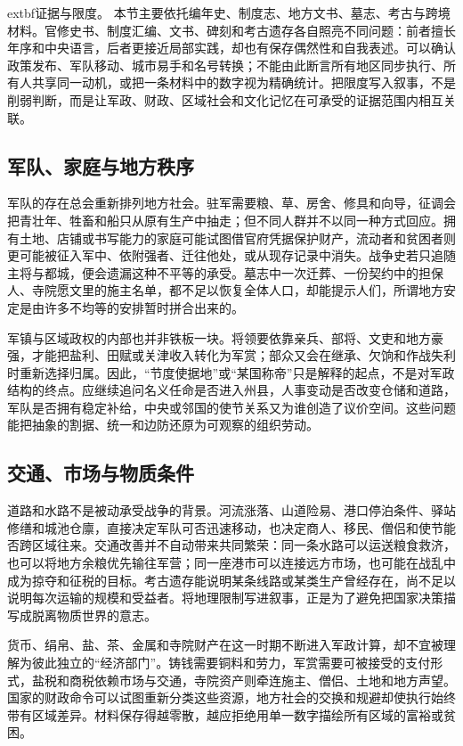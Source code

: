 \noindent	extbf{证据与限度。} 本节主要依托编年史、制度志、地方文书、墓志、考古与跨境材料。官修史书、制度汇编、文书、碑刻和考古遗存各自照亮不同问题：前者擅长年序和中央语言，后者更接近局部实践，却也有保存偶然性和自我表述。可以确认政策发布、军队移动、城市易手和名号转换；不能由此断言所有地区同步执行、所有人共享同一动机，或把一条材料中的数字视为精确统计。把限度写入叙事，不是削弱判断，而是让军政、财政、区域社会和文化记忆在可承受的证据范围内相互关联。

\subsection{军队、家庭与地方秩序}
军队的存在总会重新排列地方社会。驻军需要粮、草、房舍、修具和向导，征调会把青壮年、牲畜和船只从原有生产中抽走；但不同人群并不以同一种方式回应。拥有土地、店铺或书写能力的家庭可能试图借官府凭据保护财产，流动者和贫困者则更可能被征入军中、依附强者、迁往他处，或从现存记录中消失。战争史若只追随主将与都城，便会遗漏这种不平等的承受。墓志中一次迁葬、一份契约中的担保人、寺院愿文里的施主名单，都不足以恢复全体人口，却能提示人们，所谓地方安定是由许多不均等的安排暂时拼合出来的。

军镇与区域政权的内部也并非铁板一块。将领要依靠亲兵、部将、文吏和地方豪强，才能把盐利、田赋或关津收入转化为军赏；部众又会在继承、欠饷和作战失利时重新选择归属。因此，“节度使据地”或“某国称帝”只是解释的起点，不是对军政结构的终点。应继续追问名义任命是否进入州县，人事变动是否改变仓储和道路，军队是否拥有稳定补给，中央或邻国的使节关系又为谁创造了议价空间。这些问题能把抽象的割据、统一和边防还原为可观察的组织劳动。

\subsection{交通、市场与物质条件}
道路和水路不是被动承受战争的背景。河流涨落、山道险易、港口停泊条件、驿站修缮和城池仓廪，直接决定军队可否迅速移动，也决定商人、移民、僧侣和使节能否跨区域往来。交通改善并不自动带来共同繁荣：同一条水路可以运送粮食救济，也可以将地方余粮优先输往军营；同一座港市可以连接远方市场，也可能在战乱中成为掠夺和征税的目标。考古遗存能说明某条线路或某类生产曾经存在，尚不足以说明每次运输的规模和受益者。将地理限制写进叙事，正是为了避免把国家决策描写成脱离物质世界的意志。

货币、绢帛、盐、茶、金属和寺院财产在这一时期不断进入军政计算，却不宜被理解为彼此独立的“经济部门”。铸钱需要铜料和劳力，军赏需要可被接受的支付形式，盐税和商税依赖市场与交通，寺院资产则牵连施主、僧侣、土地和地方声望。国家的财政命令可以试图重新分类这些资源，地方社会的交换和规避却使执行始终带有区域差异。材料保存得越零散，越应拒绝用单一数字描绘所有区域的富裕或贫困。

